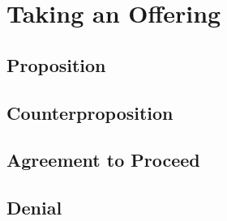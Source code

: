 \chapter{Taking an Offering}

\section{Proposition}

\section{Counterproposition}

\section{Agreement to Proceed}

\section{Denial}
